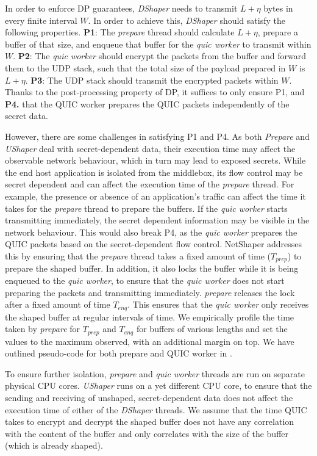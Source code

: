 In order to enforce DP guarantees, \textit{DShaper} needs to transmit $L + \eta$ bytes in every finite interval $W$.
In order to achieve this, \textit{DShaper} should satisfy the following properties.
\textbf{P1}: The \textit{prepare} thread should calculate $L + \eta$, prepare a buffer of that size, and enqueue that buffer for the \textit{quic worker} to transmit within $W$.
\textbf{P2}: The \textit{quic worker} should encrypt the packets from the buffer and forward them to the UDP stack, such that the total size of the payload prepared in $W$ is $L + \eta$.
\textbf{P3}: The UDP stack should transmit the encrypted packets within $W$.
Thanks to the post-processing property of DP, it suffices to only ensure P1, and \textbf{P4.} that the QUIC worker prepares the QUIC packets independently of the secret data.

However, there are some challenges in satisfying P1 and P4.
As both \textit{Prepare} and \textit{UShaper} deal with secret-dependent data, their execution time may affect the observable network behaviour, which in turn may lead to exposed secrets.
While the end host application is isolated from the middlebox, its flow control may be secret dependent and can affect the execution time of the \textit{prepare} thread.
For example, the presence or absence of an application's traffic can affect the time it takes for the \textit{prepare} thread to prepare the buffers.
If the \textit{quic worker} starts transmitting immediately, the secret dependent information may be visible in the network behaviour. 
This would also break P4, as the \textit{quic worker} prepares the QUIC packets based on the secret-dependent flow control.
NetShaper addresses this by ensuring that the \textit{prepare} thread takes a fixed amount of time ($T_{prep}$) to prepare the shaped buffer.
In addition, it also locks the buffer while it is being enqueued to the \textit{quic worker}, to ensure that the \textit{quic worker} does not start preparing the packets and transmitting immediately.
\textit{prepare} releases the lock after a fixed amount of time $T_{enq}$.
This ensures that the \textit{quic worker} only receives the shaped buffer at regular intervals of time.
We empirically profile the time taken by \textit{prepare} for $T_{prep}$ and $T_{enq}$ for buffers of various lengths and set the values to the maximum observed, with an additional margin on top.
We have outlined pseudo-code for both prepare and QUIC worker in .


To ensure further isolation, \textit{prepare} and \textit{quic worker} threads are run on separate physical CPU cores.
\textit{UShaper} runs on a yet different CPU core, to ensure that the sending and receiving of unshaped, secret-dependent data does not affect the execution time of either of the \textit{DShaper} threads.
We assume that the time QUIC takes to encrypt and decrypt the shaped buffer does not have any correlation with the content of the buffer and only correlates with the size of the buffer (which is already shaped).



